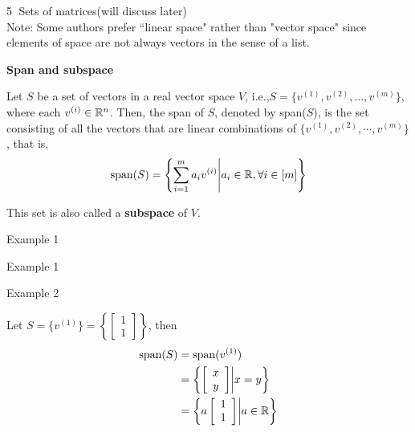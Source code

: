 \textcircled{5} Sets of matrices(will discuss later)\\
\vspace{0.3cm}
Note: Some authors prefer “linear space" rather than "vector space" since elements of space are not always vectors in the sense of a list.

\vspace{0.5cm}

\textbf{Span and subspace}

Let $S$ be a set of vectors in a real vector space $V$, i.e.,$S=\{v^{(1)}, v^{(2)}, \ldots ,v^{(m)}\}$, where each $v^{(i)}\in \mathbb{R}^{n}$. Then, the span of $S$, denoted by span($S$), is the set consisting of all the vectors that are linear combinations of $\{v^{(1)}, v^{(2)}, \cdots ,v^{(m)}\}$, that is, 
$$\text{span}(S)=\left\{\sum_{i=1}^{m} a_{i}v^{(i)}\middle| a_{i}\in \mathbb{R} ,\forall i\in [m]\right\}$$

This set is also called a \textbf{subspace} of $V$.

\vspace{0.3cm}
Example 1

\begin{marginfigure}
	\centering
	\resizebox{7.5cm}{3cm}{}
	\caption{Example 1}
	\label{fig.2-3}
\end{marginfigure}

\begin{marginfigure}
	\centering
	\resizebox{7.5cm}{3cm}{}
	\caption{Example 2}
	\label{fig.2-4}
\end{marginfigure}

Let $S=\{v^{(1)}\}=\left\{ 
\left[ 
\begin{array}{c} 
1 \\
1
\end{array}
\right]\right\}$, then
\begin{align*}
\text{span}(S)&=\text{span}({v^{(1)}})\\
&=\left\{\left[ 
	\begin{array}{c} 
	x \\
	y
	\end{array}
	\right]\middle|x=y\right\}\\
&=\left\{a\left[ 
	\begin{array}{c} 
	1 \\
	1
	\end{array}
	\right]\middle|a\in\mathbb{R}\right\}
\end{align*}\\

